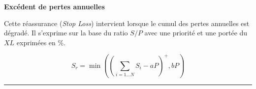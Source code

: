 \begin{f}
	
	
	
	



\textbf{Excédent de pertes annuelles}
	
	
Cette  réassurance (\emph{Stop Loss}) intervient lorsque le cumul des pertes annuelles est dégradé. 
Il s'exprime sur la base du ratio \(S/P\) avec une priorité et une portée du \(XL\) exprimées en \%.
	
\[
S_r= \min\left( \left( \sum_{i=1\ldots N} S_i - a  P\right)^+,bP\right)  
\]

\end{f}
\hrule
	
